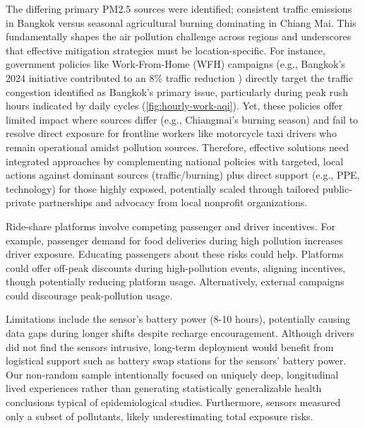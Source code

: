 The differing primary PM2.5 sources were identified; consistent traffic emissions in Bangkok versus seasonal agricultural burning dominating in Chiang Mai. 
This fundamentally shapes the air pollution challenge across regions and underscores that effective mitigation strategies must be location-specific. 
For instance, government policies like Work-From-Home (WFH) campaigns (e.g., Bangkok's 2024 initiative contributed to an 8\% traffic reduction  \cite{Wipatayotin_2025}) directly target the traffic congestion identified as Bangkok's primary issue, particularly during peak rush hours indicated by daily cycles (\autoref{fig:hourly-work-aqi}). 
Yet, these policies offer limited impact where sources differ (e.g., Chiangmai's burning season) and fail to resolve direct exposure for frontline workers like motorcycle taxi drivers who remain operational amidst pollution sources.
Therefore, effective solutions need integrated approaches by complementing national policies with targeted, local actions against dominant sources (traffic/burning) plus direct support (e.g., PPE, technology) for those highly exposed, potentially scaled through tailored public-private partnerships and advocacy from local nonprofit organizations.








Ride-share platforms involve competing passenger and driver incentives.
For example, passenger demand for food deliveries during high pollution increases driver exposure.
Educating passengers about these risks could help.
Platforms could offer off-peak discounts during high-pollution events, aligning incentives, though potentially reducing platform usage.
Alternatively, external campaigns could discourage peak-pollution usage.








Limitations include the sensor's battery power (8-10 hours), potentially causing data gaps during longer shifts despite recharge encouragement.
Although drivers did not find the sensors intrusive, long-term deployment would benefit from logistical support such as battery swap stations for the sensors' battery power.
Our non-random sample intentionally focused on uniquely deep, longitudinal lived experiences rather than generating statistically generalizable health conclusions typical of epidemiological studies.
Furthermore, sensors measured only a subset of pollutants, likely underestimating total exposure risks.
